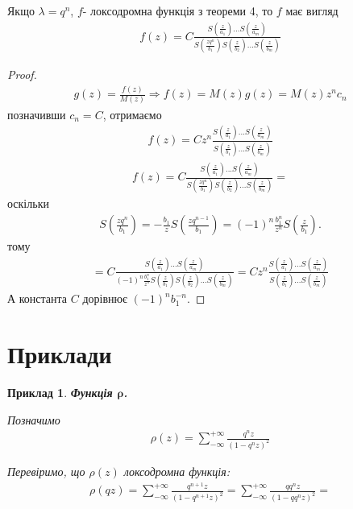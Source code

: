 \documentclass[12pt,a4paper]{article}
\begin{document}
\begin{thm}
Якщо $\lambda =q^{n}$, $f$- локсодромна функція з теореми 4, то  $f$ має вигляд
\begin{equation}\label{th51}
\begin{array}{l}
 f(z)= C\tfrac{S(\frac{z}{a_{1}})...S(\frac{z}{a_{m}})}{S(\frac{zq^{n}}{b_{1}})S(\frac{z}{b_{2}})...S(\frac{z}{b_{m}})}
\end{array}
\end{equation}
 \end{thm}
\begin{proof}
\[\begin{array}{l}
g(z)=\frac{f(z)}{M(z)}\Rightarrow f(z)=M(z)g(z)= M(z)z^{n}c_{n}
 \end{array}\]
 позначивши $c_{n}=C$, отримаємо 
 \begin{equation}\label{th52}
\begin{array}{l} 
f(z) =Cz^{n}\frac{S(\frac{z}{a_{1}})...S(\frac{z}{a_{m}})}{S(\frac{z}{b_{1}})...S(\frac{z}{b_{m}})} 
\end{array}
  \end{equation}
\[\begin{array}{l}
f(z)=C\tfrac{S(\frac{z}{a_{1}})...S(\frac{z}{a_{m}})}{S(\frac{zq^{n}}{b_{1}})S(\frac{z}{b_{2}})...S(\frac{z}{b_{m}})}= 
 \end{array}\]
оскільки
\[\begin{array}{l}
S(\frac{zq^{n}}{b_{1}})= -\frac{b_{1}}{z}S(\frac{zq^{n-1}}{b_{1}})=(-1)^{n}\frac{b_{1}^{n}}{z^{n}}S(\frac{z}{b_{1}}).
 \end{array}\]
тому
\[\begin{array}{l}
 =C\tfrac{S(\frac{z}{a_{1}})...S(\frac{z}{a_{m}})}{(-1)^{n}\frac{b_{1}^{n}}{z^{n}} S(\frac{z}{b_{1}})S(\frac{z}{b_{2}})...S(\frac{z}{b_{m}})}=Cz^{n}\frac{S(\frac{z}{a_{1}})...S(\frac{z}{a_{m}})}{S(\frac{z}{b_{1}})...S(\frac{z}{b_{m}})} 
  \end{array}\]
А константа $C$ дорівнює $(-1)^{n}b_{1}^{-n}$.
\end{proof}


\clearpage
\section{Приклади}

\newtheorem{pryk}{Приклад}
\begin{pryk}
\textit{\textbf{Функція $\mathbf{\rho}$.}}
\begin{ozn}
  Позначимо
  \[\begin{array}{l}
   \rho(z)=\sum^{+\infty}_{-\infty}  \frac{q^{n}z}{(1-q^{n}z)^2}
  \end{array}\]
\end{ozn}
Перевіримо, що $\rho(z)$ локсодромна функція:\\
\[\begin{array}{l}
 \rho(qz)=\sum^{+\infty}_{-\infty}  \frac{q^{n+1}z}{(1-q^{n+1}z)^2}=
 \sum^{+\infty}_{-\infty}  \frac{qq^{n}z}{(1-qq^{n}z)^2}=
\end{array}\]
\end{pryk}
\[\begin{array}{l}
\end{array}\]
\end{document}
